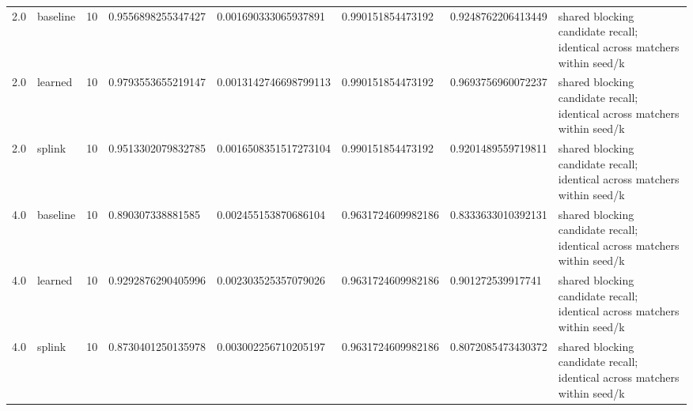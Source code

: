 \begin{longtable}{llllllll}
2.0 & baseline & 10 & 0.9556898255347427 & 0.001690333065937891 & 0.990151854473192 & 0.9248762206413449 & shared blocking candidate recall; identical across matchers within seed/k \\
2.0 & learned & 10 & 0.9793553655219147 & 0.0013142746698799113 & 0.990151854473192 & 0.9693756960072237 & shared blocking candidate recall; identical across matchers within seed/k \\
2.0 & splink & 10 & 0.9513302079832785 & 0.0016508351517273104 & 0.990151854473192 & 0.9201489559719811 & shared blocking candidate recall; identical across matchers within seed/k \\
4.0 & baseline & 10 & 0.890307338881585 & 0.002455153870686104 & 0.9631724609982186 & 0.8333633010392131 & shared blocking candidate recall; identical across matchers within seed/k \\
4.0 & learned & 10 & 0.9292876290405996 & 0.002303525357079026 & 0.9631724609982186 & 0.901272539917741 & shared blocking candidate recall; identical across matchers within seed/k \\
4.0 & splink & 10 & 0.8730401250135978 & 0.003002256710205197 & 0.9631724609982186 & 0.8072085473430372 & shared blocking candidate recall; identical across matchers within seed/k \\
\bottomrule
\end{longtable}
